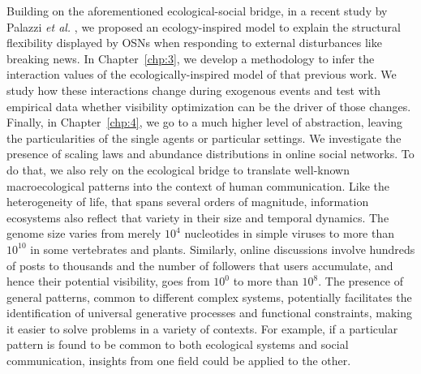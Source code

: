 Building on the aforementioned ecological-social bridge, in a recent study by Palazzi {\it et al.} \cite{palazzi2021ecological}, we proposed an ecology-inspired model \cite{suweis2013emergence,cai2021niches} to explain the structural flexibility displayed by OSNs when responding to external disturbances like breaking news. In Chapter~\ref{chp:3}, we develop a methodology to infer the interaction values of the ecologically-inspired model of that previous work. We study how these interactions change during exogenous events and test with empirical data whether visibility optimization can be the driver of those changes.  \\

Finally, in Chapter~\ref{chp:4}, we go to a much higher level of abstraction, leaving the particularities of the single agents or particular settings. We investigate the presence of scaling laws and abundance distributions in online social networks. To do that, we also rely on the ecological bridge to translate well-known macroecological patterns into the context of human communication. Like the heterogeneity of life, that spans several orders of magnitude, information ecosystems also reflect that variety in their size and temporal dynamics. The genome size varies from merely $10^4$ nucleotides in simple viruses to more than $10^{10}$ in some vertebrates and plants. Similarly, online discussions involve hundreds of posts to thousands and the number of followers that users accumulate, and hence their potential visibility, goes from $10^0$ to more than $10^8$. The presence of general patterns, common to different complex systems, potentially facilitates the identification of universal generative processes and functional constraints, making it easier to solve problems in a variety of contexts. For example, if a particular pattern is found to be common to both ecological systems and social communication, insights from one field could be applied to the other.


